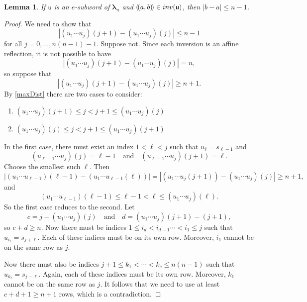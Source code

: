 \documentclass[a4paper,10pt,leqno]{amsart}
\numberwithin{equation}{section}
\newtheorem{lemma}[theorem]{Lemma}
\theoremstyle{definition}
\theoremstyle{remark}
\renewcommand{\u}{\mathsf{u}}
\newcommand{\Inv}{\textsc{inv}}
\newcommand{\blambda}{\bm{\lambda}}
\begin{document}
\begin{lemma}
\label{smallMoves}
    If $\u$ is an $e$-subword of $\blambda_n$ and $(\!(a,b)\!) \in \Inv(\u)$, then $|b - a| \leq n-1$.
\end{lemma}
\begin{proof}
    We need to show that
    \[
        \left|\left(u_1\cdots u_{j}\right)(j+1) - \left(u_1\cdots u_{j}\right)(j)\right| \leq n-1
    \]
    for all $j = 0,\dots,n(n-1)-1$. Suppose not. Since each inversion is an affine reflection, it is not possible to have
    \[
        |\left(u_1\cdots u_{j}\right)(j+1) - \left(u_1\cdots u_{j}\right)(j)| = n,
    \]
    so suppose that
    \[
        \left|\left(u_1\cdots u_{j}\right)(j+1) - \left(u_1\cdots u_{j}\right)(j)\right| \geq n+1.
    \]
    By \cref{maxDist} there are two cases to consider:
    \begin{enumerate}
        \item $\left(u_1\cdots u_{j}\right)(j+1) \leq j < j + 1 \leq \left(u_1\cdots u_{j}\right)(j)$
        \item $\left(u_1\cdots u_{j}\right)(j) \leq j < j + 1 \leq \left(u_1\cdots u_{j}\right)(j+1)$
    \end{enumerate}
    In the first case, there must exist an index $1 < \ell < j$ such that $u_\ell = s_{\ell - 1}$ and
    \[
        \left(u_{\ell + 1} \cdots u_j\right)(j) = \ell-1 \quad \text{and} \quad \left(u_{\ell + 1} \cdots u_j\right)(j+1) = \ell.
    \]
    Choose the smallest such $\ell$. Then
    \[
        \left|\left(u_{1}\cdots u_{\ell-1}\right)(\ell-1) - \left(u_{1}\cdots u_{\ell-1}(\ell)\right)\right| = \left|\left(u_1\cdots u_{j}(j+1)\right) - \left(u_1\cdots u_{j}\right)(j)\right| \geq n+1,
    \]
    and
    \[
        \left(u_1\cdots u_{\ell-1}\right)(\ell - 1) \leq \ell-1 < \ell \leq \left(u_1\cdots u_{j}\right)(\ell).
    \]
    So the first case reduces to the second.  Let
    \[
        c = j -  \left(u_1\cdots u_{j}\right)(j) \quad \text{and} \quad d = \left(u_1\cdots u_{j}\right)(j+1) - (j+1),
    \]
    so $c + d \geq n$. Now there must be indices $1 \leq i_d < i_{d-1} \cdots < i_1 \leq j$ such that $u_{i_\ell} = s_{j + \ell}$. Each of these indices must be on its own row. Moreover, $i_1$ cannot be on the same row as $j$.

    Now there must also be indices $j+1 \leq k_1 < \cdots < k_c \leq n(n-1)$ such that $u_{k_\ell} = s_{j - \ell}$. Again, each of these indices must be its own row. Moreover, $k_1$ cannot be on the same row as $j$.  It follows that we need to use at least $c + d + 1 \geq n + 1$ rows, which is a contradiction.
\end{proof}
\end{document}
